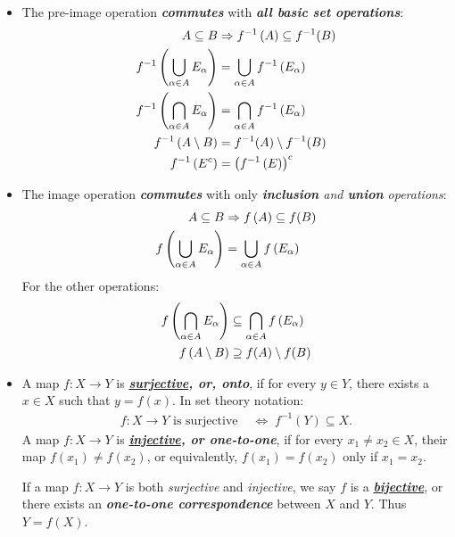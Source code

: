 \documentclass[11pt]{article}
\begin{document}
\begin{itemize}
\item \begin{remark}
The pre-image operation \emph{\textbf{commutes}} with \emph{\textbf{all basic set operations}}:
\begin{align*}
A \subseteq B & \Rightarrow f^{-1}\left(A\right) \subseteq f^{-1}(B) \\
f^{-1}\left(\bigcup_{\alpha \in A}E_{\alpha}\right) &= \bigcup_{\alpha \in A}f^{-1}\left(E_{\alpha}\right)\\
f^{-1}\left(\bigcap_{\alpha \in A}E_{\alpha}\right) &= \bigcap_{\alpha \in A}f^{-1}\left(E_{\alpha}\right)\\
f^{-1}\left(A \setminus B\right) &= f^{-1}(A) \setminus f^{-1}(B) \\
f^{-1}\left(E^c\right) &= \left(f^{-1}\left(E\right)\right)^c 
\end{align*}
\end{remark}


\item \begin{remark}
The image operation \emph{\textbf{commutes}} with only  \emph{\textbf{inclusion} and \textbf{union} operations}:
\begin{align*}
A \subseteq B & \Rightarrow f\left(A\right) \subseteq f(B) \\
f\left(\bigcup_{\alpha \in A}E_{\alpha}\right) &= \bigcup_{\alpha \in A}f\left(E_{\alpha}\right) 
\end{align*} For the other operations:
\begin{align*}
f\left(\bigcap_{\alpha \in A}E_{\alpha}\right) &\subseteq \bigcap_{\alpha \in A}f\left(E_{\alpha}\right) \\
f\left(A \setminus B\right) &\supseteq f(A) \setminus f(B)
\end{align*}
\end{remark}

\item \begin{definition}
A map $f: X\rightarrow Y$ is \emph{\textbf{\underline{surjective}, or, onto}}, if for every $y \in Y$, there exists a $x \in X$ such that $y = f(x)$. In set theory notation:
\begin{align*}
f: X\rightarrow Y \text{ is surjective }&\Leftrightarrow \; f^{-1}(Y) \subseteq X.
\end{align*}
A map $f: X\rightarrow Y$ is \emph{\textbf{\underline{injective}, or one-to-one}}, if for every $x_1 \neq x_2 \in X$, their map $f(x_1) \neq f(x_2)$, or equivalently, $f(x_1) = f(x_2)$ only if $x_1 = x_2$.

If a map $f: X\rightarrow Y$ is both \emph{surjective} and \emph{injective}, we say $f$ is a \underline{\emph{\textbf{bijective}}}, or there exists an \emph{\textbf{one-to-one correspondence}} between $X$ and $Y$. Thus $Y = f(X)$.
\end{definition}


\end{itemize}
\end{document}
